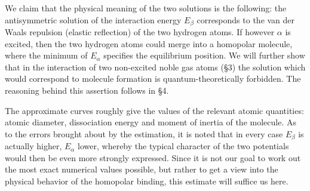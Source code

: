 \begin{paper}{1}
We claim that the physical meaning of the two solutions is the following: the antisymmetric solution of the interaction energy $E_\beta$ corresponds to the van der Waals repulsion (elastic reflection) of the two hydrogen atoms. If however $\alpha$ is excited, then the two hydrogen atoms could merge into a homopolar molecule, where the minimum of $E_\alpha$ specifies the equilibrium position. We will further show that in the interaction of two non-excited noble gas atoms (\S3) the solution which would correspond to molecule formation is quantum-theoretically forbidden. The reasoning behind this assertion follows in \S4.

The approximate curves roughly give the values of the relevant atomic quantities: atomic diameter, dissociation energy and moment of inertia of the molecule. As to the errors brought about by the estimation, it is noted that in every case $E_\beta$ is actually higher, $E_\alpha$ lower, whereby the typical character of the two potentials would then be even more strongly expressed. Since it is not our goal to work out the most exact numerical values possible, but rather to get a view into the physical behavior of the homopolar binding, this estimate will suffice us here.


\end{paper}
